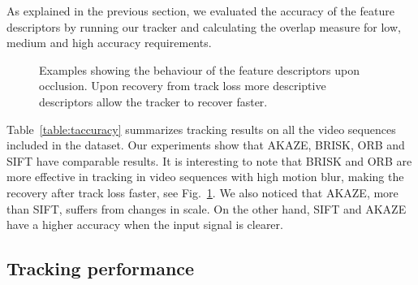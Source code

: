 As explained in the previous section, we evaluated the accuracy of the feature descriptors by running our tracker and calculating the overlap measure for low, medium and high accuracy requirements. 
\begin{figure}[!h]
	\vspace{2mm}
\centerline{%
	}
\caption{Examples showing the behaviour of the feature descriptors upon occlusion. Upon recovery from track loss more descriptive descriptors allow the tracker to recover faster.}
\vspace{-3mm}
\label{fig:tracking_results}
\end{figure}

Table~\ref{table:taccuracy} summarizes tracking results on all the video sequences included in the dataset.  Our experiments show that AKAZE, BRISK, ORB and SIFT have comparable results. It is interesting to note that BRISK and ORB are more effective in tracking in video sequences with high motion blur, making the recovery after track loss faster, see Fig.~\ref{fig:tracking_results}. We also noticed that AKAZE, more than SIFT, suffers from changes in scale. On the other hand, SIFT and AKAZE have a higher accuracy when the input signal is clearer.

\subsection{Tracking performance}

